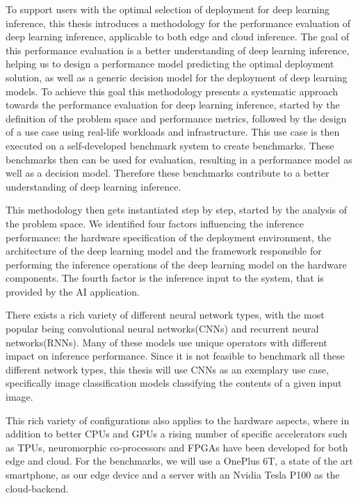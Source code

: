 To support users with the optimal selection of deployment for deep learning inference, this thesis introduces a methodology for the performance evaluation of deep learning inference, applicable to both edge and cloud inference.
The goal of this performance evaluation is a better understanding of deep learning inference, helping us to design a performance model predicting the optimal deployment solution, as well as a generic decision model for the deployment of deep learning models.
To achieve this goal this methodology presents a systematic approach towards the performance evaluation for deep learning inference, started by the definition of the problem space and performance metrics, followed by the design of a use case using real-life workloads and infrastructure. This use case is then executed on a self-developed benchmark system to create benchmarks.
These benchmarks then can be used for evaluation, resulting in a performance model as well as a decision model. Therefore these benchmarks contribute to a better understanding of deep learning inference.

This methodology then gets instantiated step by step, started by the analysis of the problem space.
We identified four factors influencing the inference performance: the hardware specification of the deployment environment, the architecture of the deep learning model and the framework responsible for performing the inference operations of the deep learning model on the hardware components. The fourth factor is the inference input to the system, that is provided by the AI application.

There exists a rich variety of different neural network types, with the most popular being convolutional neural networks(CNNs) and recurrent neural networks(RNNs).
Many of these models use unique operators with different impact on inference performance.
Since it is not feasible to benchmark all these different network types, this thesis will use CNNs as an exemplary use case, specifically image classification models classifying the contents of a given input image.

This rich variety of configurations also applies to the hardware aspects, where in addition to better CPUs and GPUs a rising number of specific accelerators such as TPUs, neuromorphic co-processors and FPGAs have been developed for both edge and cloud.
For the benchmarks, we will use a OnePlus 6T, a state of the art smartphone, as our edge device and a server with an Nvidia Tesla P100 as the cloud-backend.

